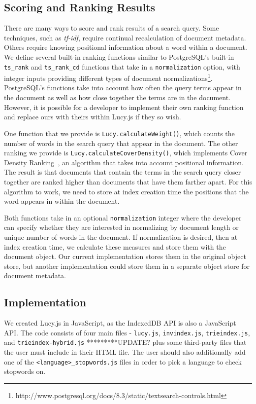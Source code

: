 \documentclass{vldb}
\begin{document}
\subsection{Scoring and Ranking Results}

There are many ways to score and rank results of a search query. Some techniques, such as \textit{tf-idf}, require continual recalculation of document metadata. Others require knowing positional information about a word within a document. We define several built-in ranking functions similar to PostgreSQL's built-in \texttt{ts\_rank} and \texttt{ts\_rank\_cd} functions that take in a \texttt{normalization} option, with integer inputs providing different types of document normalizations\footnote{http://www.postgresql.org/docs/8.3/static/textsearch-controls.html}.
PostgreSQL's functions take into account how often the query terms appear in the document as well as how close together the terms are in the document. However, it is possible for a developer to implement their own ranking function and replace ours with theirs within Lucy.js if they so wish.

One function that we provide is \texttt{Lucy.calculateWeight()}, which counts the number of words in the search query that appear in the document. The other ranking we provide is \texttt{Lucy.calculateCoverDensity()}, which implements Cover Density Ranking~\cite{li2002improvement}, an algorithm that takes into account positional information. The result is that documents that contain the terms in the search query closer together are ranked higher than documents that have them farther apart. For this algorithm to work, we need to store at index creation time the positions that the word appears in within the document. 

Both functions take in an optional \texttt{normalization} integer where the developer can specify whether they are interested in normalizing by document length or unique number of words in the document. If normalization is desired, then at index creation time, we calculate these measures and store them with the document object. Our current implementation stores them in the original object store, but another implementation could store them in a separate object store for document metadata.

\subsection{Implementation}

We created Lucy.js in JavaScript, as the IndexedDB API is also a JavaScript API. The code consists of four main files - \texttt{lucy.js}, \texttt{invindex.js}, \texttt{trieindex.js},  and \texttt{trieindex-hybrid.js} *********UPDATE? plus some third-party files that the user must include in their HTML file. The user should also additionally add one of the \texttt{<language>\_stopwords.js} files in order to pick a language to check stopwords on.
\end{document}
